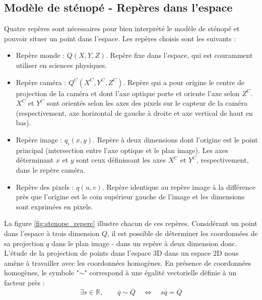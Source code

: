 \documentclass[a4paper, 11pt]{article}
\begin{document}
	\subsection*{Modèle de sténopé - Repères dans l'espace}
		Quatre repères sont nécessaires pour bien interprété le modèle de sténopé et pouvoir situer un point dans l'espace. Les repères choisis sont les suivants :
		\begin{itemize}[label=$\rightarrow$]
			\item Repère monde : $Q\left( X, Y, Z \right)$. Repère fixe dans l'espace, qui est couramment utiliser en sciences physiques.
			\item Repère caméra : $Q^C\left( X^C, Y^C, Z^C \right)$. Repère qui a pour origine le centre de projection de la caméra et dont l'axe optique porte et oriente l'axe selon $Z^C$. $X^C$ et $Y^C$ sont orientés selon les axes des pixels sur le capteur de la caméra (respectivement, axe horizontal de gauche à droite et axe vertical de haut en bas).
			\item Repère image : $q_i\left( x, y \right)$. Repère à deux dimensions dont l'origine est le point principal (intersection entre l'axe optique et le plan image). Les axes déterminant $x$ et $y$ sont ceux définissant les axes $X^C$ et $Y^C$, respectivement, dans le repère caméra.
			\item Repère des pixels : $q\left( u, v \right)$. Repère identique au repère image à la différence près que l'origine est le coin supérieur gauche de l'image et les dimensions sont exprimées en pixels.
		\end{itemize}
	La figure \ref{fig:stenope_repere} illustre chacun de ces repères. Considérant un point dans l'espace à trois dimension $Q$, il est possible de déterminer les coordonnées de sa projection $q$ dans le plan image - dans un repère à deux dimension donc. L'étude de la projection de points dans l'espace 3D dans un espace 2D nous amène à travailler avec les coordonnées homogènes. En présence de coordonnées homogènes, le symbole "$\sim$" correspond à une égalité vectorielle définie à un facteur près :
	\begin{equation}
		\exists s\in\mathbb{R}, \qquad \overline{q}\sim\overline{Q} \quad \Leftrightarrow \quad s\overline{q} = \overline{Q}
	\end{equation}
\end{document}
